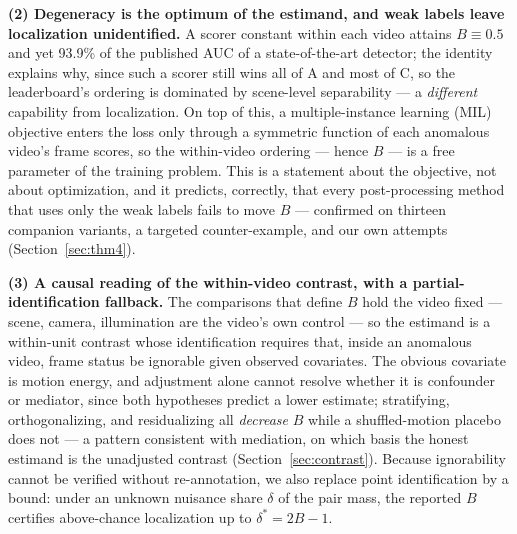 \documentclass[number,preprint,12pt]{elsarticle}
\begin{document}
\textbf{(2) Degeneracy is the optimum of the estimand, and weak labels leave
localization unidentified.} A scorer constant within each video attains
\(B\equiv 0.5\) and yet 93.9\% of the published AUC of a state-of-the-art
detector; the identity explains why, since such a scorer still wins all of A
and most of C, so the leaderboard's ordering is dominated by scene-level
separability --- a \emph{different} capability from localization. On top of this, a
multiple-instance learning (MIL) objective enters the loss only through a
symmetric function of each anomalous video's frame scores, so the within-video
ordering --- hence \(B\) --- is a free parameter of the training problem. This is
a statement about the objective, not about optimization, and it predicts,
correctly, that every post-processing method that uses only the weak labels
fails to move \(B\) --- confirmed on thirteen companion variants, a targeted
counter-example, and our own attempts (Section~\ref{sec:thm4}).

\textbf{(3) A causal reading of the within-video contrast, with a
partial-identification fallback.} The comparisons that define \(B\) hold the
video fixed --- scene, camera, illumination are the video's own control --- so
the estimand is a within-unit contrast whose identification requires that,
inside an anomalous video, frame status be ignorable given observed covariates.
The obvious covariate is motion energy, and adjustment alone cannot resolve
whether it is confounder or mediator, since both hypotheses predict a lower
estimate; stratifying, orthogonalizing, and residualizing all \emph{decrease} \(B\)
while a shuffled-motion placebo does not --- a pattern consistent with
mediation, on which basis the honest estimand is the unadjusted contrast
(Section~\ref{sec:contrast}). Because ignorability cannot be verified without
re-annotation, we also replace point identification by a bound: under an
unknown nuisance share \(\delta\) of the pair mass, the reported \(B\) certifies
above-chance localization up to \(\delta^{*}=2B-1\).
\end{document}
